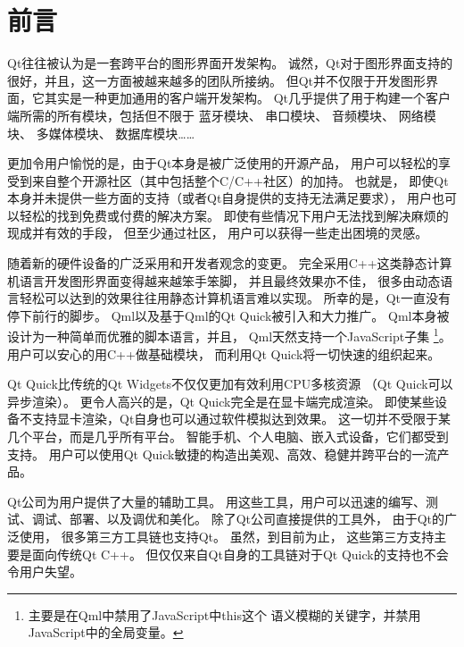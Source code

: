 ﻿%






\cleardoublepage                              %
\setcounter{secnumdepth}{-2}                  %
\chapter{
前言
}\label{c000020}
\setcounter{secnumdepth}{3}                   %


Qt往往被认为是一套跨平台的图形界面开发架构。
诚然，Qt对于图形界面支持的很好，并且，这一方面被越来越多的团队所接纳。
但Qt并不仅限于开发图形界面，它其实是一种更加通用的客户端开发架构。
Qt几乎提供了用于构建一个客户端所需的所有模块，包括但不限于
蓝牙模块、
串口模块、
音频模块、
网络模块、
多媒体模块、
数据库模块……

更加令用户愉悦的是，由于Qt本身是被广泛使用的开源产品，
用户可以轻松的享受到来自整个开源社区（其中包括整个C/C++社区）的加持。
也就是，
即使Qt本身并未提供一些方面的支持（或者Qt自身提供的支持无法满足要求），
用户也可以轻松的找到免费或付费的解决方案。
即使有些情况下用户无法找到解决麻烦的现成并有效的手段，
但至少通过社区，
用户可以获得一些走出困境的灵感。

随着新的硬件设备的广泛采用和开发者观念的变更。
完全采用C++这类静态计算机语言开发图形界面变得越来越笨手笨脚，
并且最终效果亦不佳，
很多由动态语言轻松可以达到的效果往往用静态计算机语言难以实现。
所幸的是，Qt一直没有停下前行的脚步。
Qml以及基于Qml的Qt Quick被引入和大力推广。
Qml本身被设计为一种简单而优雅的脚本语言，并且，
Qml天然支持一个JavaScript子集
\footnote{
主要是在Qml中禁用了JavaScript中this这个
语义模糊的关键字，并禁用JavaScript中的全局变量。
}。
用户可以安心的用C++做基础模块，
而利用Qt Quick将一切快速的组织起来。


Qt Quick比传统的Qt Widgets不仅仅更加有效利用CPU多核资源
（Qt Quick可以异步渲染）。
更令人高兴的是，Qt Quick完全是在显卡端完成渲染。
即使某些设备不支持显卡渲染，Qt自身也可以通过软件模拟达到效果。
这一切并不受限于某几个平台，而是几乎所有平台。
智能手机、个人电脑、嵌入式设备，它们都受到支持。
用户可以使用Qt Quick敏捷的构造出美观、高效、稳健并跨平台的一流产品。

Qt公司为用户提供了大量的辅助工具。
用这些工具，用户可以迅速的编写、测试、调试、部署、以及调优和美化。
除了Qt公司直接提供的工具外，
由于Qt的广泛使用，
很多第三方工具链也支持Qt。
虽然，到目前为止，
这些第三方支持主要是面向传统Qt C++。
但仅仅来自Qt自身的工具链对于Qt Quick的支持也不会令用户失望。


